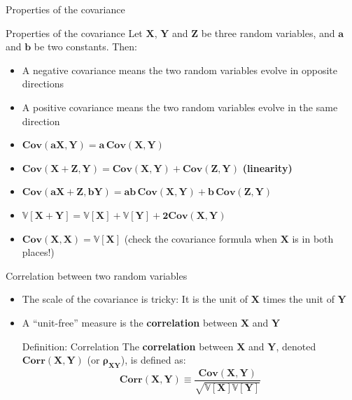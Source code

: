 \documentclass[
  ignorenonframetext,
  aspectratio=169]{beamer}
\providecommand{\tightlist}{%
  \setlength{\itemsep}{0pt}\setlength{\parskip}{0pt}}
\begin{document}
\begin{frame}{Properties of the covariance}
\protect\hypertarget{properties-of-the-covariance}{}
\begin{block}{Properties of the covariance}
Let $\bm{X}$, $\bm{Y}$ and $\bm{Z}$ be three random variables, and $\bm{a}$ and $\bm{b}$ be two constants. Then:
\begin{itemize}
\item A negative covariance means the two random variables evolve in opposite directions
\item A positive covariance means the two random variables evolve in the same direction
\item $\bm{Cov(aX, Y) = a\,Cov(X,Y)}$ 
\item $\bm{Cov(X+Z,Y) = Cov(X,Y)+ Cov(Z,Y)}$ \textbf{(linearity)}
\item $\bm{Cov(aX+Z,bY) = ab\,Cov(X,Y)+ b\,Cov(Z,Y)}$ 
\item $\bm{\mathbb{V}[X+Y] = \mathbb{V}[X] + \mathbb{V}[Y] + 2Cov(X,Y)}$
\item $\bm{Cov(X, X)=\mathbb{V}[X]}$ (check the covariance formula when $\bm{X}$ is in both places!)
\end{itemize}
\end{block}
\end{frame}

\begin{frame}{Correlation between two random variables}
\protect\hypertarget{correlation-between-two-random-variables}{}
\begin{itemize}
\tightlist
\item
  The scale of the covariance is tricky: It is the unit of \(\bm{X}\)
  times the unit of \(\bm{Y}\)
\item
  A ``unit-free'' measure is the \textbf{correlation} between \(\bm{X}\)
  and \(\bm{Y}\)

  \begin{block}{Definition: Correlation}
  The \textbf{correlation} between $\bm{X}$ and $\bm{Y}$, denoted $\bm{Corr(X,Y)}$ (or $\bm{\rho_{XY}}$), is defined as: 
  $$
  \bm{Corr(X,Y) \equiv \frac{Cov(X,Y)}{\sqrt{\mathbb{V}[X]\mathbb{V}[Y]} } }
  $$
  \end{block}
\end{itemize}
\end{frame}
\end{document}
